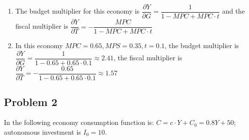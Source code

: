 \documentclass[a4paper,12pt]{article} %
\begin{document}
\begin{enumerate}[label=\alph*)]
\item  The budget multiplier for this economy is $ \dfrac{\partial Y}{\partial G} = \dfrac{1}{1-MPC+MPC\cdot t} $ and  the fiscal multiplier is $ \dfrac{\partial Y}{\partial T} = -\dfrac{MPC}{1-MPC+MPC\cdot t} $

\item  In this economy $ MPC=0.65, MPS=0.35, t=0.1 $, the budget multiplier is $ \dfrac{\partial Y}{\partial G} = \dfrac{1}{1-0.65+0.65\cdot 0.1} \approx 2.41 $, the fiscal multiplier is $ \dfrac{\partial Y}{\partial T} = -\dfrac{0.65}{1-0.65+0.65\cdot 0.1} \approx 1.57  $

\end{enumerate}

\subsection*{Problem 2} 

In the following economy consumption function is: $ C = c \cdot Y +C_{0}  = 0.8Y + 50 $; autonomous
investment is  $ I_{0} = 10 $.
\end{document}
